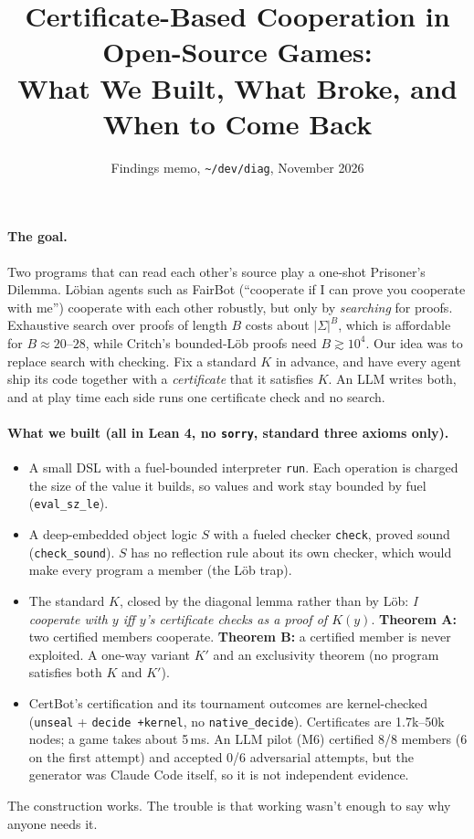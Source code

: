 \documentclass[11pt]{article}
\title{\vspace{-1.5em}Certificate-Based Cooperation in Open-Source Games:\\ What We Built, What Broke, and When to Come Back}
\author{Findings memo, \texttt{\~{}/dev/diag}, November 2026}
\date{\vspace{-2em}}
\begin{document}
\maketitle

\paragraph{The goal.}
Two programs that can read each other's source play a one-shot Prisoner's Dilemma. Löbian agents such as FairBot (``cooperate if I can prove you cooperate with me'') cooperate with each other robustly, but only by \emph{searching} for proofs. Exhaustive search over proofs of length $B$ costs about $|\Sigma|^B$, which is affordable for $B \approx 20$--$28$, while Critch's bounded-Löb proofs need $B \gtrsim 10^4$. Our idea was to replace search with checking. Fix a standard $K$ in advance, and have every agent ship its code together with a \emph{certificate} that it satisfies $K$. An LLM writes both, and at play time each side runs one certificate check and no search.

\paragraph{What we built (all in Lean 4, no \texttt{sorry}, standard three axioms only).}
\begin{itemize}
\item A small DSL with a fuel-bounded interpreter \texttt{run}. Each operation is charged the size of the value it builds, so values and work stay bounded by fuel (\texttt{eval\_sz\_le}).
\item A deep-embedded object logic $S$ with a fueled checker \texttt{check}, proved sound (\texttt{check\_sound}). $S$ has no reflection rule about its own checker, which would make every program a member (the Löb trap).
\item The standard $K$, closed by the diagonal lemma rather than by Löb: \emph{I cooperate with $y$ iff $y$'s certificate checks as a proof of $K(y)$}. \textbf{Theorem A:} two certified members cooperate. \textbf{Theorem B:} a certified member is never exploited. A one-way variant $K'$ and an exclusivity theorem (no program satisfies both $K$ and $K'$).
\item CertBot's certification and its tournament outcomes are kernel-checked (\texttt{unseal} + \texttt{decide +kernel}, no \texttt{native\_decide}). Certificates are 1.7k--50k nodes; a game takes about 5\,ms. An LLM pilot (M6) certified 8/8 members (6 on the first attempt) and accepted 0/6 adversarial attempts, but the generator was Claude Code itself, so it is not independent evidence.
\end{itemize}
The construction works. The trouble is that working wasn't enough to say why anyone needs it.
\end{document}
